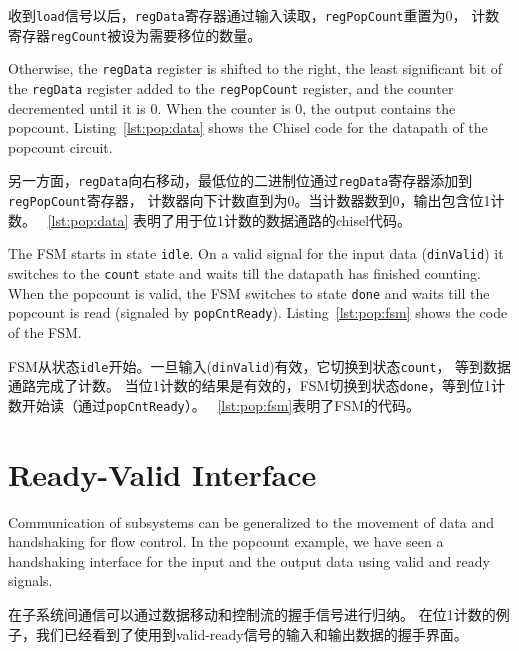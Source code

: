 \documentclass[%
    10pt,
    headinclude, footexclude,
    openright, %
    notitlepage,
    cleardoubleempty,
    headsepline,
    pointlessnumbers,
    bibtotoc, idxtotoc,
    ]{scrbook}
\newcommand{\code}[1]{{\small{\texttt{#1}}}}
\newcommand{\todo}[1]{{\emph{TODO: #1}}}
\renewcommand{\todo}[1]{}
\begin{document}
{收到\code{load}信号以后，\code{regData}寄存器通过输入读取，\code{regPopCount}重置为0，
计数寄存器\code{regCount}被设为需要移位的数量。

Otherwise, the \code{regData} register is shifted to the right, the least significant bit
of the \code{regData} register added to the \code{regPopCount} register, and the counter
decremented until it is 0. When the counter is 0, the output contains the popcount.
Listing~\ref{lst:pop:data} shows the Chisel code for the datapath of the popcount
circuit.

另一方面，\code{regData}向右移动，最低位的二进制位通过\code{regData}寄存器添加到\code{regPopCount}寄存器，
计数器向下计数直到为0。当计数器数到0，输出包含位1计数。
~\ref{lst:pop:data} 表明了用于位1计数的数据通路的chisel代码。


The FSM starts in state \code{idle}. On a valid signal for the input data (\code{dinValid}) it
switches to the \code{count} state and waits till the datapath has finished counting.
When the popcount is valid, the FSM switches to state \code{done} and waits till the
popcount is read (signaled by \code{popCntReady}).
Listing~\ref{lst:pop:fsm} shows the code of the FSM.

FSM从状态\code{idle}开始。一旦输入(\code{dinValid})有效，它切换到状态\code{count}，
等到数据通路完成了计数。
当位1计数的结果是有效的，FSM切换到状态\code{done}，等到位1计数开始读（通过\code{popCntReady}）。
~\ref{lst:pop:fsm}表明了FSM的代码。


\section{Ready-Valid Interface}

\todo{Luca: This comes very sudden after all this FSM reading.
Maybe give some more context and a timing diagram.}

Communication of subsystems can be generalized to the movement
of data and handshaking for flow control. In the popcount example,
we have seen a handshaking interface for the input and the output data
using valid and ready signals.

在子系统间通信可以通过数据移动和控制流的握手信号进行归纳。
在位1计数的例子，我们已经看到了使用到valid-ready信号的输入和输出数据的握手界面。

}
\end{document}
